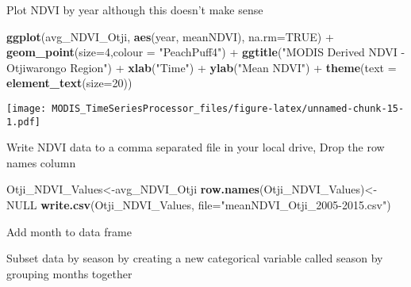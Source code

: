\documentclass[]{article}
\newenvironment{Shaded}{\begin{snugshade}}{\end{snugshade}}
\newcommand{\KeywordTok}[1]{\textcolor[rgb]{0.13,0.29,0.53}{\textbf{{#1}}}}
\newcommand{\DataTypeTok}[1]{\textcolor[rgb]{0.13,0.29,0.53}{{#1}}}
\newcommand{\DecValTok}[1]{\textcolor[rgb]{0.00,0.00,0.81}{{#1}}}
\newcommand{\StringTok}[1]{\textcolor[rgb]{0.31,0.60,0.02}{{#1}}}
\newcommand{\OtherTok}[1]{\textcolor[rgb]{0.56,0.35,0.01}{{#1}}}
\newcommand{\NormalTok}[1]{{#1}}
\begin{document}
Plot NDVI by year although this doesn't make sense

\begin{Shaded}
\begin{Highlighting}[]
\KeywordTok{ggplot}\NormalTok{(avg_NDVI_Otji, }\KeywordTok{aes}\NormalTok{(year, meanNDVI), }\DataTypeTok{na.rm=}\OtherTok{TRUE}\NormalTok{) +}
\StringTok{  }\KeywordTok{geom_point}\NormalTok{(}\DataTypeTok{size=}\DecValTok{4}\NormalTok{,}\DataTypeTok{colour =} \StringTok{"PeachPuff4"}\NormalTok{) +}\StringTok{ }
\StringTok{  }\KeywordTok{ggtitle}\NormalTok{(}\StringTok{"MODIS Derived NDVI - Otjiwarongo Region"}\NormalTok{) +}
\StringTok{  }\KeywordTok{xlab}\NormalTok{(}\StringTok{"Time"}\NormalTok{) +}\StringTok{ }\KeywordTok{ylab}\NormalTok{(}\StringTok{"Mean NDVI"}\NormalTok{) +}
\StringTok{  }\KeywordTok{theme}\NormalTok{(}\DataTypeTok{text =} \KeywordTok{element_text}\NormalTok{(}\DataTypeTok{size=}\DecValTok{20}\NormalTok{))}
\end{Highlighting}
\end{Shaded}

\texttt{[image: MODIS\_TimeSeriesProcessor\_files/figure-latex/unnamed-chunk-15-1.pdf]}

Write NDVI data to a comma separated file in your local drive, Drop the
row names column

\begin{Shaded}
\begin{Highlighting}[]
\NormalTok{Otji_NDVI_Values<-avg_NDVI_Otji}
\KeywordTok{row.names}\NormalTok{(Otji_NDVI_Values)<-}\OtherTok{NULL}
\KeywordTok{write.csv}\NormalTok{(Otji_NDVI_Values, }\DataTypeTok{file=}\StringTok{"meanNDVI_Otji_2005-2015.csv"}\NormalTok{)}
\end{Highlighting}
\end{Shaded}

Add month to data frame

\begin{Shaded}
\end{Shaded}

Subset data by season by creating a new categorical variable called
season by grouping months together
\end{document}
